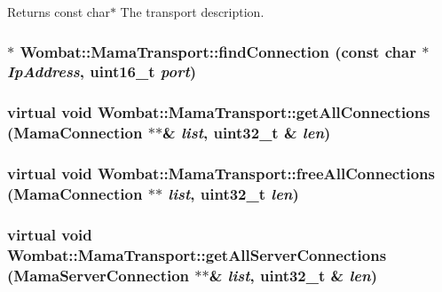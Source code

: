\begin{DoxyReturn}{Returns}
const char$\ast$ The transport description. 
\end{DoxyReturn}
\hypertarget{classWombat_1_1MamaTransport_a7a202932111eceeffe410a713de76a0e}{
\subsubsection[{findConnection}]{$\ast$ Wombat::MamaTransport::findConnection (const char $\ast$ {\em IpAddress}, \/  uint16\_\-t {\em port})}}
\label{classWombat_1_1MamaTransport_a7a202932111eceeffe410a713de76a0e}
\hypertarget{classWombat_1_1MamaTransport_afb8b42ec79dd7407ee0ef2b32f0dc74a}{
\subsubsection[{getAllConnections}]{\setlength{\rightskip}{0pt plus 5cm}virtual void Wombat::MamaTransport::getAllConnections ({\bf MamaConnection} $\ast$$\ast$\& {\em list}, \/  uint32\_\-t \& {\em len})}}
\label{classWombat_1_1MamaTransport_afb8b42ec79dd7407ee0ef2b32f0dc74a}
\hypertarget{classWombat_1_1MamaTransport_a2085dd9d95f10e9be371d147f573905a}{
\subsubsection[{freeAllConnections}]{\setlength{\rightskip}{0pt plus 5cm}virtual void Wombat::MamaTransport::freeAllConnections ({\bf MamaConnection} $\ast$$\ast$ {\em list}, \/  uint32\_\-t {\em len})}}
\label{classWombat_1_1MamaTransport_a2085dd9d95f10e9be371d147f573905a}
\hypertarget{classWombat_1_1MamaTransport_a920be68f58b955170dc81e6386d4526c}{
\subsubsection[{getAllServerConnections}]{\setlength{\rightskip}{0pt plus 5cm}virtual void Wombat::MamaTransport::getAllServerConnections ({\bf MamaServerConnection} $\ast$$\ast$\& {\em list}, \/  uint32\_\-t \& {\em len})}}
